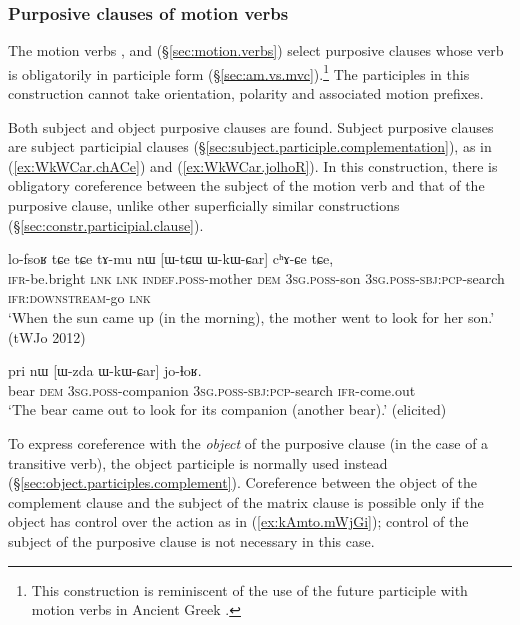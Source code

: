 \subsubsection{Purposive clauses of motion verbs} \label{sec:purposive.clause.motion.verbs}
The motion verbs ,  and   (§\ref{sec:motion.verbs}) select purposive clauses whose verb is obligatorily in participle form (§\ref{sec:am.vs.mvc}).\footnote{This construction is reminiscent of the use of the future participle with motion verbs in Ancient Greek \citep[§177.B]{vernhes96hermaion}. } The participles in this construction cannot take orientation, polarity and associated motion prefixes.

Both subject and object purposive clauses are found. Subject purposive clauses are subject participial clauses (§\ref{sec:subject.participle.complementation}), as in (\ref{ex:WkWCar.chACe}) and (\ref{ex:WkWCar.jolhoR}). In this construction, there is obligatory coreference between the subject of the motion verb and that of the purposive clause, unlike other superficially similar constructions (§\ref{sec:constr.participial.clause}).

\begin{exe}
	\ex \label{ex:WkWCar.chACe}
	\gll lo-fsoʁ tɕe tɕe tɤ-mu nɯ [ɯ-tɕɯ ɯ-kɯ-ɕar] cʰɤ-ɕe tɕe,\\
	\textsc{ifr}-be.bright \textsc{lnk} \textsc{lnk} \textsc{indef}.\textsc{poss}-mother \textsc{dem} \textsc{3sg}.\textsc{poss}-son \textsc{3sg}.\textsc{poss}-\textsc{sbj}:\textsc{pcp}-search \textsc{ifr}:\textsc{downstream}-go \textsc{lnk} \\
	\glt `When the sun came up (in the morning), the mother went to look for her son.' (tWJo 2012)
\end{exe}

\begin{exe}
	\ex \label{ex:WkWCar.jolhoR}
	\gll pri nɯ [ɯ-zda ɯ-kɯ-ɕar] jo-ɬoʁ. \\
	bear \textsc{dem} \textsc{3sg}.\textsc{poss}-companion \textsc{3sg}.\textsc{poss}-\textsc{sbj}:\textsc{pcp}-search \textsc{ifr}-come.out \\
	\glt `The bear came out to look for its companion (another bear).' (elicited)
\end{exe}

To express coreference with the \textit{object} of the purposive clause (in the case of a transitive verb), the object participle is normally used instead (§\ref{sec:object.participles.complement}).  Coreference between the object of the complement clause and the subject of the matrix clause is possible only if the object has control over the action as in (\ref{ex:kAmto.mWjGi}); control of the subject of the purposive clause is not necessary in this case.

